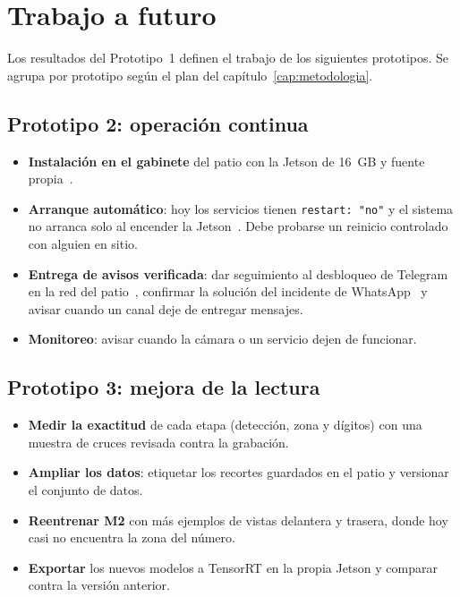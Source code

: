 \chapter{Trabajo a futuro}
\label{cap:futuro}

Los resultados del Prototipo~1 definen el trabajo de los siguientes
prototipos. Se agrupa por prototipo según el plan del
capítulo~\ref{cap:metodologia}.

\section{Prototipo 2: operación continua}

\begin{itemize}
  \item \textbf{Instalación en el gabinete} del patio con la Jetson de
        16~GB y fuente propia~\cite{rep-tecnico}.
  \item \textbf{Arranque automático}: hoy los servicios tienen
        \texttt{restart: "no"} y el sistema no arranca solo al encender la
        Jetson~\cite{rep-tecnico}. Debe probarse un reinicio controlado con
        alguien en sitio.
  \item \textbf{Entrega de avisos verificada}: dar seguimiento al
        desbloqueo de Telegram en la red del patio~\cite{rep-envivo},
        confirmar la solución del incidente de WhatsApp~\cite{rep-whatsapp}
        y avisar cuando un canal deje de entregar mensajes.
  \item \textbf{Monitoreo}: avisar cuando la cámara o un servicio dejen de
        funcionar.
\end{itemize}

\section{Prototipo 3: mejora de la lectura}

\begin{itemize}
  \item \textbf{Medir la exactitud} de cada etapa (detección, zona y
        dígitos) con una muestra de cruces revisada contra la grabación.
  \item \textbf{Ampliar los datos}: etiquetar los recortes guardados en el
        patio y versionar el conjunto de datos.
  \item \textbf{Reentrenar M2} con más ejemplos de vistas delantera y
        trasera, donde hoy casi no encuentra la zona del número.
  \item \textbf{Exportar} los nuevos modelos a TensorRT en la propia Jetson
        y comparar contra la versión anterior.
\end{itemize}

